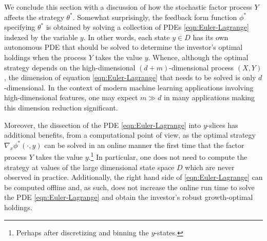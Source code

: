 \documentclass{article}
\theoremstyle{plain}
\theoremstyle{definition}
\newcommand{\Pcal}{{\mathcal P}}
\numberwithin{lem}{section}
\begin{document}
We conclude this section with a discussion of how the stochastic factor process $Y$ affects the strategy $\theta^*$. Somewhat surprisingly, the feedback form function $\phi^*$ specifying $\theta^*$ is obtained by solving a collection of PDEs \eqref{eqn:Euler-Lagrange} indexed by the variable $y$. In other words, each state $y \in D$ has its own autonomous PDE that should be solved to determine the investor's optimal holdings when the process $Y$ takes the value $y$. Whence, although the optimal strategy depends on the high-dimensional $(d+m)$-dimensional process $(X,Y)$, the dimension of equation \eqref{eqn:Euler-Lagrange} that needs to be solved is only $d$-dimensional. In the context of modern machine learning applications involving high-dimensional features, one may expect $m \gg d$ in many applications making this dimension reduction significant. 

Moreover, the dissection of the PDE \eqref{eqn:Euler-Lagrange} into $y$-slices has additional benefits, from a computational point of view, as the optimal strategy $\nabla_x \phi^*(\cdot,y)$ can be solved in an online manner the first time that the factor process $Y$ takes the value $y$.\footnote{Perhaps after discretizing and binning the $y$-states.} In particular, one does not need to compute the strategy at values of the large dimensional state space $D$ which are never observed in practice. Additionally, the right hand side of \eqref{eqn:Euler-Lagrange} can be computed offline and, as such, does not increase the online run time to solve the PDE \eqref{eqn:Euler-Lagrange} and obtain the investor's robust growth-optimal holdings.


\end{document}
